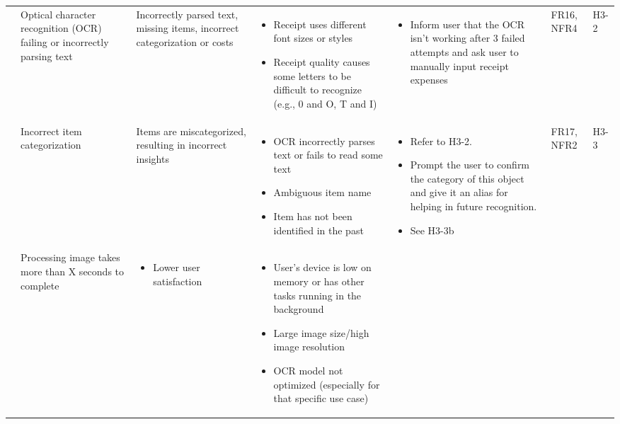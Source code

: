 \documentclass{article}
\begin{document}
\begin{landscape}
\begin{longtable}{|p{3cm}|p{4cm}|p{5cm}|p{5cm}|p{5cm}|p{1cm}|p{0.75cm}|}
    \cline{2-7}
    &
    Optical character recognition (OCR) failing or incorrectly parsing text &
    Incorrectly parsed text, missing items, incorrect categorization or costs &
    \begin{itemize}[leftmargin=0.5cm]
        \item Receipt uses different font sizes or styles
        \item Receipt quality causes some letters to be difficult to recognize (e.g., 0 and O, T and I)
    \end{itemize} &
    \begin{itemize}[leftmargin=0.5cm]
        \item Inform user that the OCR isn’t working after 3 failed attempts and ask user to manually input receipt expenses
    \end{itemize} &
    FR16, NFR4 &
    H3-2\\
    \cline{2-7}
    &
    Incorrect item categorization &
    Items are miscategorized, resulting in incorrect insights &
    \begin{itemize}[leftmargin=0.5cm]
        \item OCR incorrectly parses text or fails to read some text
        \item Ambiguous item name
        \item Item has not been identified in the past
    \end{itemize} &
    \begin{itemize}[leftmargin=0.5cm]
        \item Refer to H3-2.
        \item Prompt the user to confirm the category of this object and give it an alias for helping in future recognition.
        \item See H3-3b
    \end{itemize} &
    FR17, NFR2 &
    H3-3\\
    \cline{2-7}
    & 
    Processing image takes more than X seconds to complete &
    \begin{itemize}[leftmargin=0.5cm]
        \item Lower user satisfaction
    \end{itemize} &
    \begin{itemize}[leftmargin=0.5cm]
        \item User’s device is low on memory or has other tasks running in the background
        \item Large image size/high image resolution
        \item OCR model not optimized (especially for that specific use case)

\end{itemize}
\end{longtable}
\end{landscape}
\end{document}
